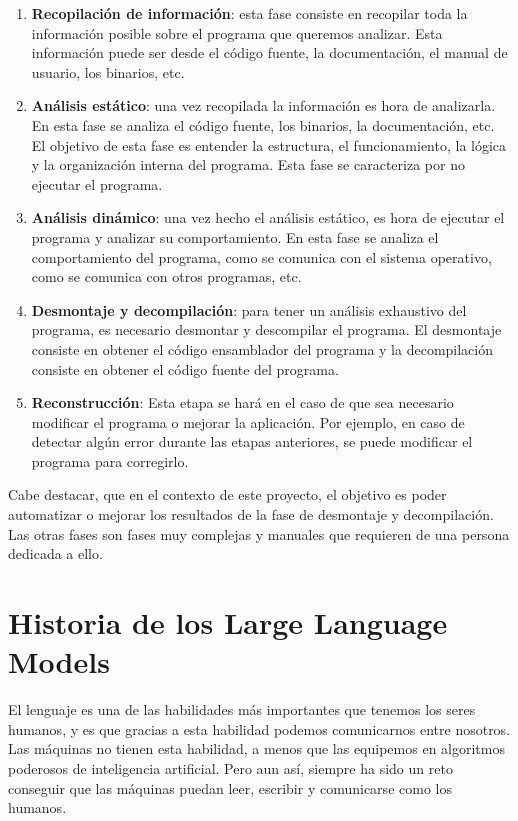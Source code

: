 \begin{enumerate}
    \item \textbf{Recopilación de información}: esta fase consiste en recopilar toda la información posible
        sobre el programa que queremos analizar. Esta información puede ser desde el código fuente, la
        documentación, el manual de usuario, los binarios, etc.
    \item \textbf{Análisis estático}: una vez recopilada la información es hora de analizarla. En esta fase
        se analiza el código fuente, los binarios, la documentación, etc. El objetivo de esta fase es
        entender la estructura, el funcionamiento, la lógica y la organización interna del programa. Esta fase
        se caracteriza por no ejecutar el programa.
    \item \textbf{Análisis dinámico}: una vez hecho el análisis estático, es hora de ejecutar el programa
        y analizar su comportamiento. En esta fase se analiza el comportamiento del programa, como se comunica
        con el sistema operativo, como se comunica con otros programas, etc.
    \item \textbf{Desmontaje y decompilación}: para tener un análisis exhaustivo del programa, es necesario
        desmontar y descompilar el programa. El desmontaje consiste en obtener el código ensamblador del programa
        y la decompilación consiste en obtener el código fuente del programa.
    \item \textbf{Reconstrucción}: Esta etapa se hará en el caso de que sea necesario modificar el programa o
        mejorar la aplicación. Por ejemplo, en caso de detectar algún error durante las etapas anteriores, se
        puede modificar el programa para corregirlo.
\end{enumerate}

Cabe destacar, que en el contexto de este proyecto, el objetivo es poder automatizar o mejorar los resultados
de la fase de desmontaje y decompilación. Las otras fases son fases muy complejas y manuales que requieren
de una persona dedicada a ello.

\section{Historia de los Large Language Models}
\label{sec:historia}


El lenguaje es una de las habilidades más importantes que tenemos los seres humanos, y es
que gracias a esta habilidad podemos comunicarnos entre nosotros. Las máquinas no
tienen esta habilidad, a menos que las equipemos en algoritmos poderosos de inteligencia
artificial. Pero aun así, siempre ha sido un reto conseguir que las máquinas puedan leer,
escribir y comunicarse como los humanos.

